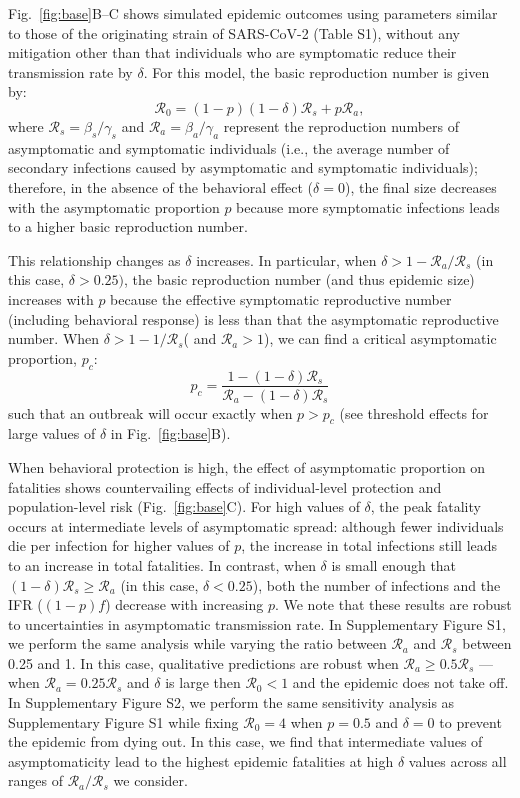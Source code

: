 \documentclass[12pt]{article}
\newcommand{\fref}[1]{Fig.~\ref{fig:#1}}
\newcommand{\RR}{\ensuremath{{\mathcal R}}\xspace}
\begin{document}
\fref{base}B--C shows simulated epidemic outcomes using parameters similar to those of the originating strain of SARS-CoV-2 (Table S1), without any mitigation other than that individuals who are symptomatic reduce their transmission rate by $\delta$. 
For this model, the basic reproduction number is given by:
\begin{equation}
\RR_0 = (1-p) (1-\delta) \RR_s + p \RR_a,
\end{equation}
where $\RR_s = \beta_s/\gamma_s$ and $\RR_a = \beta_a/\gamma_a$ represent the reproduction numbers of asymptomatic and symptomatic individuals (i.e., the average number of secondary infections caused by asymptomatic and symptomatic individuals);
therefore, in the absence of the behavioral effect ($\delta=0$), the final size decreases with the asymptomatic proportion $p$ because more symptomatic infections leads to a higher basic reproduction number.

This relationship changes as $\delta$ increases.
In particular, when $\delta > 1-\RR_a/\RR_s$ (in this case, $\delta > 0.25)$, the basic reproduction number (and thus epidemic size) increases with $p$ because the effective symptomatic reproductive number (including behavioral response) is less than that the asymptomatic reproductive number.
When $\delta > 1-1/\RR_s$( and $\RR_a>1$), we can find a critical asymptomatic proportion, $p_c$:
\begin{equation}
    p_c = \frac{1 - (1-\delta) \RR_s}{\RR_a - (1-\delta) \RR_s}
\end{equation}
such that an outbreak will occur exactly when $p>p_c$ (see threshold effects for large values of $\delta$ in \fref{base}B).

When behavioral protection is high, the effect of asymptomatic proportion on fatalities shows countervailing effects of individual-level protection and population-level risk (\fref{base}C).
For high values of $\delta$, the peak fatality occurs at intermediate levels of asymptomatic spread:
although fewer individuals die per infection for higher values of $p$, the increase in total infections still leads to an increase in total fatalities.
In contrast, when $\delta$ is small enough that $(1-\delta) \RR_s \geq \RR_a$ (in this case, $\delta < 0.25$), both the number of infections and the IFR ($(1-p)f$) decrease with increasing $p$.
We note that these results are robust to uncertainties in asymptomatic transmission rate.
In Supplementary Figure S1, we perform the same analysis while varying the ratio between $\RR_a$ and $\RR_s$ between 0.25 and 1.
In this case, qualitative predictions are robust when $\RR_a \geq 0.5 \RR_s$
--- when $\RR_a = 0.25 \RR_s$ and $\delta$ is large then $\RR_0 < 1$ and the epidemic does not take off.
In Supplementary Figure S2, we perform the same sensitivity analysis as Supplementary Figure S1 while fixing $\RR_0 = 4$ when $p=0.5$ and $\delta=0$ to prevent the epidemic from dying out. In this case, we find that intermediate values of asymptomaticity lead to the highest epidemic fatalities at high $\delta$ values across all ranges of $\RR_a/\RR_s$ we consider.
\end{document}
